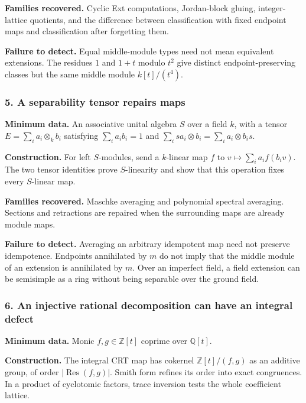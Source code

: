 \documentclass[
  11pt,
]{article}
\begin{document}
\textbf{Families recovered.} Cyclic Ext computations, Jordan-block
gluing, integer-lattice quotients, and the difference between
classification with fixed endpoint maps and classification after
forgetting them.

\textbf{Failure to detect.} Equal middle-module types need not mean
equivalent extensions. The residues \(1\) and \(1+t\) modulo \(t^2\)
give distinct endpoint-preserving classes but the same middle module
\(k[t]/(t^4)\).

\subsubsection*{5. A separability tensor repairs
maps}\label{a-separability-tensor-repairs-maps}

\textbf{Minimum data.} An associative unital algebra \(S\) over a field
\(k\), with a tensor \(E=\sum_i a_i\otimes_k b_i\) satisfying
\(\sum_i a_ib_i=1\) and
\(\sum_i sa_i\otimes b_i=\sum_i a_i\otimes b_i s\).

\textbf{Construction.} For left \(S\)-modules, send a \(k\)-linear map
\(f\) to \(v\mapsto\sum_i a_i f(b_iv)\). The two tensor identities prove
\(S\)-linearity and show that this operation fixes every \(S\)-linear
map.

\textbf{Families recovered.} Maschke averaging and polynomial spectral
averaging. Sections and retractions are repaired when the surrounding
maps are already module maps.

\textbf{Failure to detect.} Averaging an arbitrary idempotent map need
not preserve idempotence. Endpoints annihilated by \(m\) do not imply
that the middle module of an extension is annihilated by \(m\). Over an
imperfect field, a field extension can be semisimple as a ring without
being separable over the ground field.

\subsubsection*{6. An injective rational decomposition can have an
integral
defect}\label{an-injective-rational-decomposition-can-have-an-integral-defect}

\textbf{Minimum data.} Monic \(f,g\in\mathbb Z[t]\) coprime over
\(\mathbb Q[t]\).

\textbf{Construction.} The integral CRT map has cokernel
\(\mathbb Z[t]/(f,g)\) as an additive group, of order
\(|\operatorname{Res}(f,g)|\). Smith form refines its order into exact
congruences. In a product of cyclotomic factors, trace inversion tests
the whole coefficient lattice.
\end{document}
